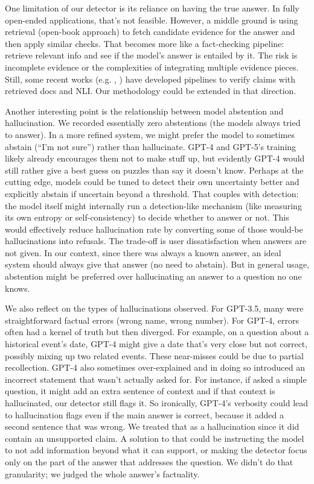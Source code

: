 \documentclass{article}
\begin{document}
One limitation of our detector is its reliance on having the true answer. In fully open-ended applications, that’s not feasible. However, a middle ground is using retrieval (open-book approach) to fetch candidate evidence for the answer and then apply similar checks. That becomes more like a fact-checking pipeline: retrieve relevant info and see if the model’s answer is entailed by it. The risk is incomplete evidence or the complexities of integrating multiple evidence pieces. Still, some recent works (e.g. \cite{thorne2018fever}, \cite{nie2019factcheck}) have developed pipelines to verify claims with retrieved docs and NLI. Our methodology could be extended in that direction.

Another interesting point is the relationship between model abstention and hallucination. We recorded essentially zero abstentions (the models always tried to answer). In a more refined system, we might prefer the model to sometimes abstain (“I’m not sure”) rather than hallucinate. GPT-4 and GPT-5’s training likely already encourages them not to make stuff up, but evidently GPT-4 would still rather give a best guess on puzzles than say it doesn’t know. Perhaps at the cutting edge, models could be tuned to detect their own uncertainty better and explicitly abstain if uncertain beyond a threshold. That couples with detection: the model itself might internally run a detection-like mechanism (like measuring its own entropy or self-consistency) to decide whether to answer or not. This would effectively reduce hallucination rate by converting some of those would-be hallucinations into refusals. The trade-off is user dissatisfaction when answers are not given. In our context, since there was always a known answer, an ideal system should always give that answer (no need to abstain). But in general usage, abstention might be preferred over hallucinating an answer to a question no one knows.

We also reflect on the types of hallucinations observed. For GPT-3.5, many were straightforward factual errors (wrong name, wrong number). For GPT-4, errors often had a kernel of truth but then diverged. For example, on a question about a historical event's date, GPT-4 might give a date that’s very close but not correct, possibly mixing up two related events. These near-misses could be due to partial recollection. GPT-4 also sometimes over-explained and in doing so introduced an incorrect statement that wasn't actually asked for. For instance, if asked a simple question, it might add an extra sentence of context and if that context is hallucinated, our detector still flags it. So ironically, GPT-4’s verbosity could lead to hallucination flags even if the main answer is correct, because it added a second sentence that was wrong. We treated that as a hallucination since it did contain an unsupported claim. A solution to that could be instructing the model to not add information beyond what it can support, or making the detector focus only on the part of the answer that addresses the question. We didn't do that granularity; we judged the whole answer’s factuality.
\end{document}
